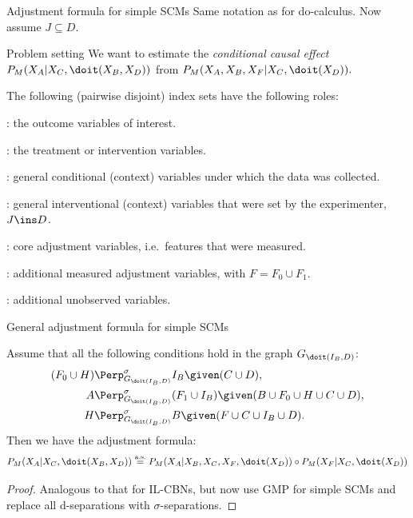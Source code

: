 \begin{frame}{Adjustment formula for simple SCMs}
Same notation as for do-calculus. Now assume $J \subseteq D$.
\begin{block}{Problem setting}
We want to estimate the \emph{conditional causal effect}
$P_{M}(X_A|X_C,\doit(X_B,X_D))$
from
$P_{M}(X_A,X_B,X_F|X_C,\doit(X_D)).$
\end{block}
The following (pairwise disjoint) index sets have the following roles:\\
\begin{description}\small
  \item[$A$]: the outcome variables of interest.
  \item[$B$]: the treatment or intervention variables.
  \item[$C$]: general conditional (context) variables under which the data was collected.
  \item[$D$]: general interventional (context) variables that were set by the experimenter, $J \ins D$.
  \item[$F_0$]: core adjustment variables, i.e.\ features that were measured.
  \item[$F_1$]: additional measured adjustment variables, with $F = F_0 \cup F_1$.
  \item[$H$]: additional unobserved variables.
\end{description}
\end{frame}

\begin{frame}{General adjustment formula for simple SCMs}
  \begin{Thm}
    Assume that all the following conditions hold in the graph $G_{\doit(I_B,D)}$:
    \begin{align}
        (F_0 \cup H) & \Perp^\sigma_{G_{\doit(I_B,D)}} I_B \given (C \cup D), \\
        A & \Perp^\sigma_{G_{\doit(I_B,D)}} (F_1 \cup I_B) \given (B \cup F_0 \cup H \cup C \cup D), \\
                      H &\Perp^\sigma_{G_{\doit(I_B,D)}} B \given (F \cup C \cup  I_B \cup D).
    \end{align}
Then we have the adjustment formula:\small
    \[ P_{M}(X_A|X_C,\doit(X_B,X_D)) \stackrel{\text{a.s.}}{=}
    P_{M}(X_A|X_B,X_C,X_F,\doit(X_D)) \circ P_{M}(X_F|X_C,\doit(X_D))
\]
\end{Thm}
\begin{proof}
  Analogous to that for IL-CBNs, but now use GMP for simple SCMs and replace all d-separations with $\sigma$-separations.
\end{proof}

\end{frame}



